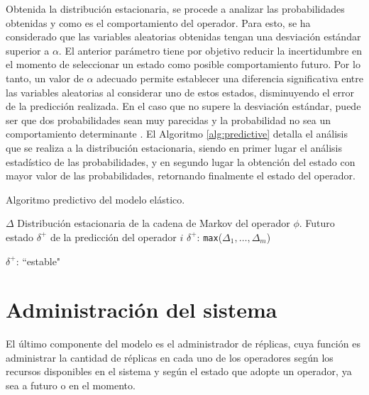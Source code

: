 

Obtenida la distribución estacionaria, se procede a analizar las probabilidades obtenidas y como es el comportamiento del operador. Para esto, se ha considerado que las variables aleatorias obtenidas tengan una desviación estándar superior a $\alpha$. El anterior parámetro tiene por objetivo reducir la incertidumbre en el momento de seleccionar un estado como posible comportamiento futuro. \normalsize{Por lo tanto, un valor de $\alpha$ adecuado permite establecer una diferencia significativa entre las variables aleatorias al considerar uno de estos estados, disminuyendo el error de la predicción realizada.} En el caso que no supere la desviación estándar, puede ser que dos probabilidades sean muy parecidas y la probabilidad no sea un comportamiento determinante \citep{soong2004fundamentals}. El Algoritmo \ref{alg:predictive} detalla el análisis que se realiza a la distribución estacionaria, siendo en primer lugar el análisis estadístico de las probabilidades, y en segundo lugar la obtención del estado con mayor valor de las probabilidades, retornando finalmente el estado del operador.

\begin{algorithm}[t]
	\caption{Algoritmo predictivo del modelo elástico.}
	\label{alg:predictive}
	\begin{algorithmic}[1]
	\REQUIRE$\Delta$ Distribución estacionaria de la cadena de Markov del operador $\phi$.
	\ENSURE Futuro estado $\delta^{+}$ de la predicción del operador $i$
		\RETURN $\delta^{+}$: \texttt{max}({$\Delta_1,\ldots,\Delta_m$})

	\ELSE
		\RETURN $\delta^{+}$: ``estable"
	\ENDIF
	\end{algorithmic}
\end{algorithm}

\section{Administración del sistema}

El último componente del modelo es el administrador de réplicas, cuya función es administrar la cantidad de réplicas en cada uno de los operadores según los recursos disponibles en el sistema y según el estado que adopte un operador, ya sea a futuro o en el momento.

